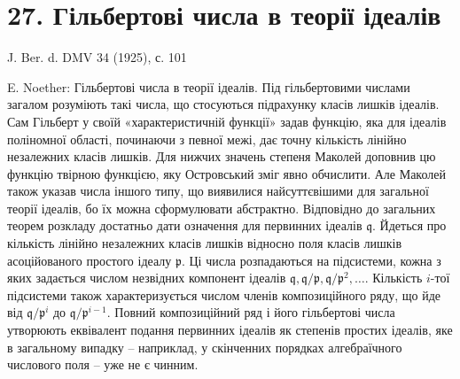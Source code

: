 \documentclass[11pt]{article}
\begin{document}
\section*{27. Гільбертові числа в теорії ідеалів}

\begin{center}
J. Ber. d. DMV 34 (1925), с. 101
\end{center}

E. Noether: Гільбертові числа в теорії ідеалів. Під гільбертовими числами загалом розуміють такі числа, що стосуються підрахунку класів лишків ідеалів. Сам Гільберт у своїй «характеристичній функції» задав функцію, яка для ідеалів поліномної області, починаючи з певної межі, дає точну кількість лінійно незалежних класів лишків. Для нижчих значень степеня Маколей доповнив цю функцію твірною функцією, яку Островський зміг явно обчислити. Але Маколей також указав числа іншого типу, що виявилися найсуттєвішими для загальної теорії ідеалів, бо їх можна сформулювати абстрактно. Відповідно до загальних теорем розкладу достатньо дати означення для первинних ідеалів $\mathfrak q$. Йдеться про кількість лінійно незалежних класів лишків відносно поля класів лишків асоційованого простого ідеалу $\mathfrak p$. Ці числа розпадаються на підсистеми, кожна з яких задається числом незвідних компонент ідеалів $\mathfrak q,\mathfrak q/\mathfrak p,\mathfrak q/\mathfrak p^2,\ldots$. Кількість $i$-тої підсистеми також характеризується числом членів композиційного ряду, що йде від $\mathfrak q/\mathfrak p^i$ до $\mathfrak q/\mathfrak p^{i-1}$. Повний композиційний ряд і його гільбертові числа утворюють еквівалент подання первинних ідеалів як степенів простих ідеалів, яке в загальному випадку -- наприклад, у скінченних порядках алгебраїчного числового поля -- уже не є чинним.
\end{document}
